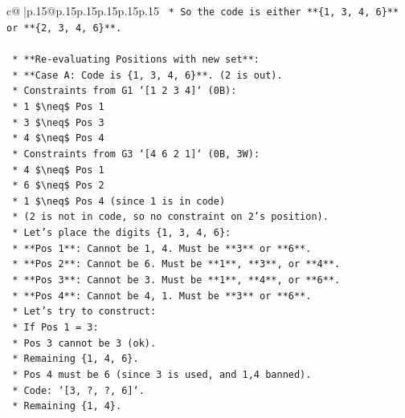\documentclass{article}
\begin{document}
{\begin{supertabular}{c@{$\;$}|p{.15\linewidth}@{}p{.15\linewidth}p{.15\linewidth}p{.15\linewidth}p{.15\linewidth}p{.15\linewidth}}
{{{\texttt{        *   So the code is either **\{1, 3, 4, 6\}** or **\{2, 3, 4, 6\}**.} \\
\\ 
\texttt{    *   **Re{-}evaluating Positions with new set**:} \\
\texttt{        *   **Case A: Code is \{1, 3, 4, 6\}**. (2 is out).} \\
\texttt{            *   Constraints from G1 `{[}1 2 3 4{]}` (0B):} \\
\texttt{                *   1 \$\textbackslash{}neq\$ Pos 1} \\
\texttt{                *   3 \$\textbackslash{}neq\$ Pos 3} \\
\texttt{                *   4 \$\textbackslash{}neq\$ Pos 4} \\
\texttt{            *   Constraints from G3 `{[}4 6 2 1{]}` (0B, 3W):} \\
\texttt{                *   4 \$\textbackslash{}neq\$ Pos 1} \\
\texttt{                *   6 \$\textbackslash{}neq\$ Pos 2} \\
\texttt{                *   1 \$\textbackslash{}neq\$ Pos 4 (since 1 is in code)} \\
\texttt{                *   (2 is not in code, so no constraint on 2's position).} \\
\texttt{            *   Let's place the digits \{1, 3, 4, 6\}:} \\
\texttt{                *   **Pos 1**: Cannot be 1, 4. Must be **3** or **6**.} \\
\texttt{                *   **Pos 2**: Cannot be 6. Must be **1**, **3**, or **4**.} \\
\texttt{                *   **Pos 3**: Cannot be 3. Must be **1**, **4**, or **6**.} \\
\texttt{                *   **Pos 4**: Cannot be 4, 1. Must be **3** or **6**.} \\
\texttt{            *   Let's try to construct:} \\
\texttt{                *   If Pos 1 = 3:} \\
\texttt{                    *   Pos 3 cannot be 3 (ok).} \\
\texttt{                    *   Remaining \{1, 4, 6\}.} \\
\texttt{                    *   Pos 4 must be 6 (since 3 is used, and 1,4 banned).} \\
\texttt{                    *   Code: `{[}3, ?, ?, 6{]}`.} \\
\texttt{                    *   Remaining \{1, 4\}.} \\
}}}
\end{supertabular}}
\end{document}
